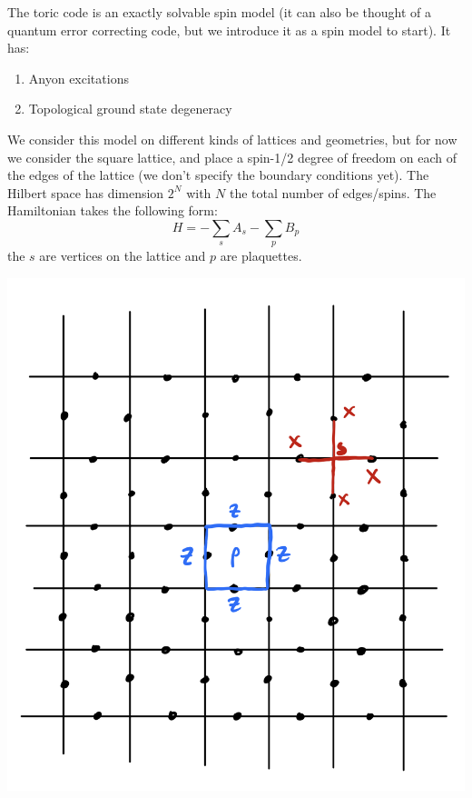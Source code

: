The toric code is an exactly solvable spin model (it can also be thought of a quantum error correcting code, but we introduce it as a spin model to start). It has:
\begin{enumerate}
    \item Anyon excitations
    \item Topological ground state degeneracy
\end{enumerate}
We consider this model on different kinds of lattices and geometries, but for now we consider the square lattice, and place a spin-1/2 degree of freedom on each of the edges of the lattice (we don't specify the boundary conditions yet). The Hilbert space has dimension $2^N$ with $N$ the total number of edges/spins. The Hamiltonian takes the following form:
\begin{equation}
    H = -\sum_s A_s - \sum_p B_p
\end{equation}
the $s$ are vertices on the lattice and $p$ are plaquettes.

\begin{center}
    \includegraphics[scale=0.4]{Lectures/Images/lec1-toriccodeops.png}
\end{center}

